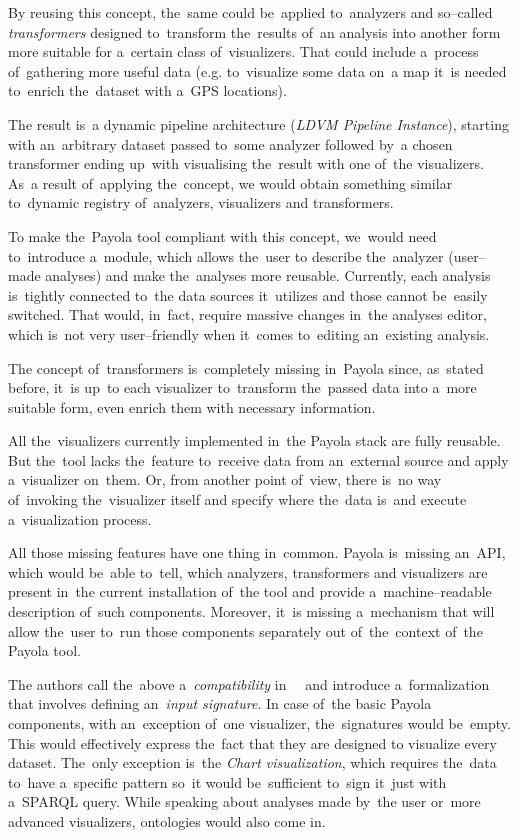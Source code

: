 By reusing this concept, the~same could be~applied to~analyzers and so--called 
\emph{transformers} designed to~transform the~results of~an analysis 
into another form more suitable for a~certain class of~visualizers. 
That could include a~process of~gathering more useful data (e.g. to~visualize 
some data on~a map it~is needed to~enrich the~dataset with a~GPS locations).

The result is~a dynamic pipeline architecture (\emph{LDVM Pipeline Instance}),
starting with an~arbitrary 
dataset passed to~some analyzer followed by~a chosen transformer ending up~with
visualising the~result with one of~the visualizers. As~a result of~applying the~concept,
we would obtain something similar to~dynamic 
registry of~analyzers, visualizers and transformers.

To make the~Payola tool 
compliant with this concept, we~would need to~introduce a~module, which allows the~user
to describe the~analyzer (user--made analyses) and make the~analyses more reusable. Currently, each analysis is~tightly connected to~the 
data sources it~utilizes and those cannot be~easily switched. That would, in~fact, require massive changes in~the analyses editor, which is~not very 
user--friendly when it~comes to~editing an~existing analysis.

The concept of~transformers is~completely missing in~Payola since, as~stated 
before, it~is up~to each visualizer to~transform the~passed data into a~more 
suitable form, even enrich them with necessary information.

All the~visualizers currently implemented in~the Payola stack are fully 
reusable. But the~tool lacks the~feature to~receive data from an~external source 
and apply a~visualizer on~them. Or, from another point of~view, there is~no 
way of~invoking the~visualizer itself and specify where the~data is~and execute a~visualization process.

All those missing features have one thing in~common. Payola is~missing 
an~API, which would be~able to~tell, which analyzers, transformers and 
visualizers are present in~the current installation of~the tool and provide a~machine--readable description of~such components. Moreover, it~is missing a~mechanism that will allow the~user to~run those components separately out of~the~context of~the Payola tool.

The authors call the~above a~\emph{compatibility} in~~\cite{ldvm2} and 
introduce a~formalization that involves defining an~\emph{input signature}.
In case of~the basic Payola components, with an~exception of~one visualizer, the~signatures
would be~empty. This would effectively express the~fact that they are designed to
visualize every dataset. The~only exception is~the \emph{Chart visualization},
which requires the~data to~have a~specific pattern so~it would be~sufficient to~sign it~just with a~SPARQL query. While speaking about analyses made by~the user or~more 
advanced visualizers, ontologies would also come in.

